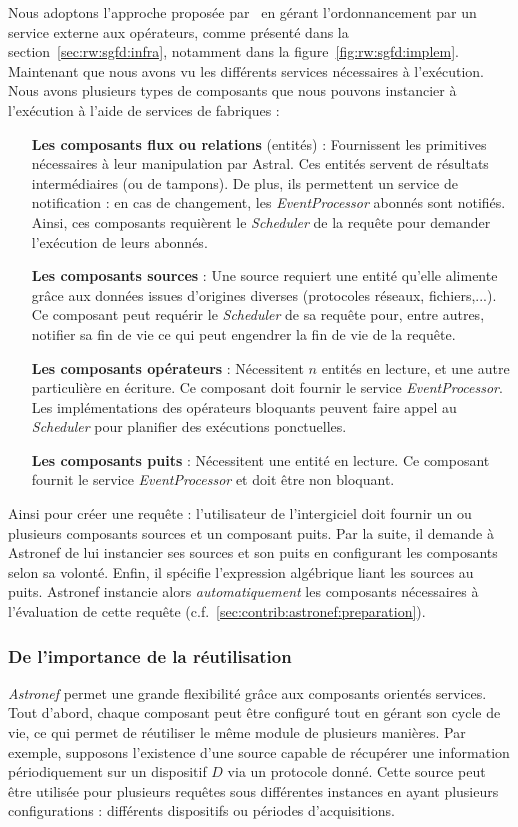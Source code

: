 Nous adoptons l'approche proposée par~\cite{Carney:scheduling} en gérant l'ordonnancement par un service externe aux opérateurs, comme présenté dans la section~\ref{sec:rw:sgfd:infra}, notamment dans la figure~\ref{fig:rw:sgfd:implem}. Maintenant que nous avons vu les différents services nécessaires à l'exécution. Nous avons plusieurs types de composants que nous pouvons instancier à l'exécution à l'aide de services de fabriques :
\begin{itemize}
	\item[\textbf{Les composants flux ou relations} (entités)] : Fournissent les primitives nécessaires à leur manipulation par Astral. Ces entités servent de résultats intermédiaires (ou de tampons). De plus, ils permettent un service de notification : en cas de changement, les \textit{EventProcessor} abonnés sont notifiés. Ainsi, ces composants requièrent le \textit{Scheduler} de la requête pour demander l'exécution de leurs abonnés.
	\item[\textbf{Les composants sources}] : Une source requiert une entité qu'elle alimente grâce aux données issues d'origines diverses (protocoles réseaux, fichiers,...). Ce composant peut requérir le \textit{Scheduler} de sa requête pour, entre autres, notifier sa fin de vie ce qui peut engendrer la fin de vie de la requête.
	\item[\textbf{Les composants opérateurs}] : Nécessitent $n$ entités en lecture, et une autre particulière en écriture. Ce composant doit fournir le service \textit{EventProcessor}. Les implémentations des opérateurs bloquants peuvent faire appel au \textit{Scheduler} pour planifier des exécutions ponctuelles.
	\item[\textbf{Les composants puits}] : Nécessitent une entité en lecture. Ce composant fournit le service \textit{EventProcessor} et doit être non bloquant.
\end{itemize}

Ainsi pour créer une requête : l'utilisateur de l'intergiciel doit fournir un ou plusieurs composants sources et un composant puits. Par la suite, il demande à Astronef de lui instancier ses sources et son puits en configurant les composants selon sa volonté. Enfin, il spécifie l'expression algébrique liant les sources au puits. Astronef instancie alors \textit{automatiquement} les composants nécessaires à l'évaluation de cette requête (c.f.~\ref{sec:contrib:astronef:preparation}).

\subsubsection{De l'importance de la réutilisation}
\textit{Astronef} permet une grande flexibilité grâce aux composants orientés services. Tout d'abord, chaque composant peut être configuré tout en gérant son cycle de vie, ce qui permet de réutiliser le même module de plusieurs manières. Par exemple, supposons l'existence d'une source capable de récupérer une information périodiquement sur un dispositif $D$ via un protocole donné. Cette source peut être utilisée pour plusieurs requêtes sous différentes instances en ayant plusieurs configurations : différents dispositifs ou périodes d'acquisitions.

